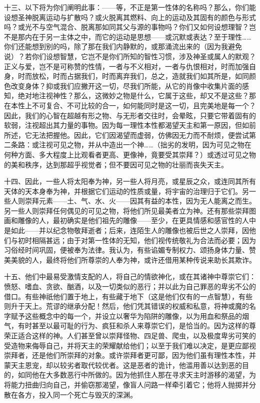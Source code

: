 十三、以下将为你们阐明此事：——等，不正是第一性体的名称吗？那么，你们能设想圣神脱离运动与扩散吗？或火脱离其燃料、向上的运动及其固有的颜色与形式吗？或光不与空气混合、脱离那如同其父与源的事物吗？你们又如何设想理智？岂不是那内在于另一主体之中，而它的运动是思想——或沉默或表达？至于理性……你们还能想到别的吗，除了那在我们内静默的，或那涌流出来的（因为我避免说）？若你们设想智慧，它岂不是你们所知的智性习惯，涉及神圣或属人的默观？正义与爱，岂不是可称赞的性情，一者与不义相对，一者与仇恨相对，时而加强自身，时而放松，时而占据我们，时而离弃我们，总之，造就我们如其所是，如同颜色改变身体？抑或我们应撇开这一切，尽我们所能，从它的肖像中收集片面的感知，绝对地注视神性？那么，这微妙之物是什么，它属于这些，却又不是这些？那在本性上不可复合、不可比较的合一，如何能同时是这一切，且完美地是每一个？因此，我们的心智在超越有形之物、与无形者交往时，会晕眩，只要它带着固有的软弱，注视超出其力量的事物。因为每一理性本性都渴望天主和第一原因，但如前所述，它无法把握他。因此，它们因渴望而虚弱，仿佛因无力而不耐烦，便尝试第二条路：或注视可见之物，并从中造出一个神……（拙劣的发明，因为可见之物在何种方面、多大程度上比观看者更高、更像神，竟要受其崇拜？）或透过可见之物的美和秩序，达到那超乎视觉者；但不要因可见之物的壮丽而丧失天主。\par

十四、因此，一些人将太阳奉为神，另一些人将月亮，或星辰之众，或连同其所有天体的天本身奉为神，并根据它们运动的性质或量，将宇宙的治理归于它们。另一些人则崇拜元素——土、气、水、火——因其有益的本性，因为无人能离之而生。另一些人则崇拜任何偶见的可见之物，将他们所见最美者立为神。还有那些崇拜图画和雕像的人，最初确实是他们祖先的雕像——至少，在更具情感和感官性的人中是如此——并以纪念物敬拜逝者；后来，连陌生人的雕像也被后世之人崇拜，因他们与初时相隔甚远；由于对第一性体的无知，他们视传统敬礼为合法而必要；因为习俗经时间巩固，便被奉为法律。我认为，有些谄媚专制权力、颂扬身体力量、赞美美貌的人，最终将他们所尊崇的人奉为神，或许还借用某种传说来助长其欺诈。\par

十五、他们中最易受激情支配的人，将自己的情欲神化，或在其诸神中尊崇它们：愤怒、嗜血、贪欲、酗酒，以及一切类似的恶行；并以此为自己罪恶的卑劣不公的借口。有些神祇他们置于地上，有些藏于地下（这是他们仅有的一点智慧），有些则升于天上。荒谬的继承分配！然后，他们凭其错误的权威和私意，将神或魔的名字赋予这些概念中的每一个，并设立以奢华为陷阱的雕像，以为用血和祭品的烟气，有时甚至以最可耻的行为、疯狂和杀人来尊崇它们，是恰当的。因为这样的尊荣正适合这样的神。人们甚至曾以崇拜怪物、四足兽、爬虫，以及极度卑劣可笑的受造物来侮辱自己，并将天主的荣耀献给他们；以至于我们难以决定，是更应鄙视崇拜者，还是他们所崇拜的对象。或许崇拜者更可鄙，因为他们虽有理性本性，并蒙天主恩宠，却以较劣者取代较优者。这是恶者的诡计，他滥用善以达到恶的目的，如同他在大多数恶行中所做的。因为他抓住人那在寻求天主时游移的渴望，为将能力扭曲归向自己，并偷窃那渴望，像盲人问路一样牵引着它；他将人抛掷并分散在各方，投入同一个死亡与毁灭的深渊。\par

